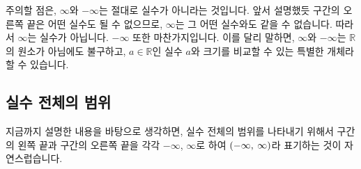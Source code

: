 주의할 점은, $\infty$와 $-\infty$는 절대로 실수가 아니라는 것입니다. 앞서 설명했듯 구간의 오른쪽 끝은 어떤 실수도 될 수 없으므로, $\infty$는 그 어떤 실수와도 같을 수 없습니다. 따라서 $\infty$는 실수가 아닙니다. $-\infty$ 또한 마찬가지입니다. 이를 달리 말하면, $\infty$와 $-\infty$는 $\mathbb{R}$의 원소가 아님에도 불구하고, $a \in \mathbb R$인 실수 $a$와 크기를 비교할 수 있는 특별한 개체라 할 수 있습니다.

\subsection{실수 전체의 범위}
지금까지 설명한 내용을 바탕으로 생각하면, 실수 전체의 범위를 나타내기 위해서 구간의 왼쪽 끝과 구간의 오른쪽 끝을 각각 $-\infty$, $\infty$로 하여 $\left(-\infty,\: \infty\right)$라 표기하는 것이 자연스럽습니다.

